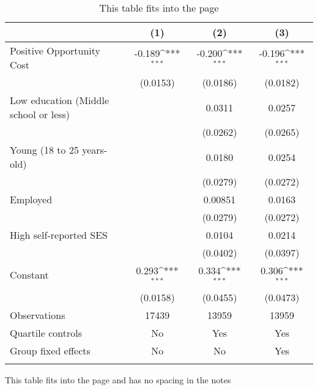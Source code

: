\documentclass[11pt,a4paper]{article}
\begin{document}
\begin{table}[H]
	\caption{This table fits into the page}
	\label{notlongnote}
{
	\def\sym#1{\ifmmode^{#1}\else\(^{#1}\)\fi}
	\begin{tabular}{l*{3}{c}}
		\hline\hline
		&\multicolumn{1}{c}{(1)}         &\multicolumn{1}{c}{(2)}         &\multicolumn{1}{c}{(3)}         \\
		\hline
		Positive Opportunity Cost&      -0.189\sym{***}&      -0.200\sym{***}&      -0.196\sym{***}\\
		&    (0.0153)         &    (0.0186)         &    (0.0182)         \\
		[1em]
		Low education (Middle school or less)&                     &      0.0311         &      0.0257         \\
		&                     &    (0.0262)         &    (0.0265)         \\
		[1em]
		Young (18 to 25 years-old)&                     &      0.0180         &      0.0254         \\
		&                     &    (0.0279)         &    (0.0272)         \\
		[1em]
		Employed            &                     &     0.00851         &      0.0163         \\
		&                     &    (0.0279)         &    (0.0272)         \\
		[1em]
		High self-reported SES&                     &      0.0104         &      0.0214         \\
		&                     &    (0.0402)         &    (0.0397)         \\
		[1em]
		Constant            &       0.293\sym{***}&       0.334\sym{***}&       0.306\sym{***}\\
		&    (0.0158)         &    (0.0455)         &    (0.0473)         \\
		\hline
		Observations        &       17439         &       13959         &       13959         \\
		Quartile controls   &          No         &         Yes         &         Yes         \\
		Group fixed effects &          No         &          No         &         Yes         \\
		\hline\hline
		\multicolumn{4}{p{\textwidth}}{\footnotesize \lipsum[1]}\\
	\end{tabular}
}
\end{table}

\begin{table}[H]
	\caption{This table fits into the page and has no spacing in the notes}
	\label{notlongnote2}
		
\end{table}
\end{document}
